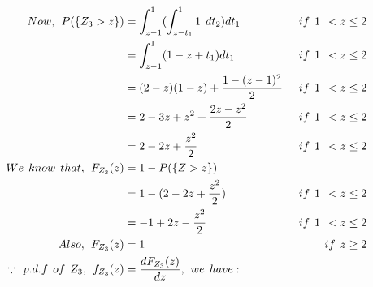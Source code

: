 \documentclass[a4paper,fleqn,11pt]{article}
\theoremstyle{mytheor}
\begin{document}
\begin{align*}
Now, \hspace{1ex} P (\{ Z_3 > z\}) & = \int_{z-1}^{1} (\int_{z - t_{1}}^{1} 1 \hspace{1ex} dt_{2}) dt_{1} \hspace{1ex} & if \hspace{1ex} 1 \hspace{1ex} < z \leq 2 \\
& = \int_{z - 1}^{1} (1 - z + t_{1}) dt_{1} \hspace{1ex} & if \hspace{1ex} 1 \hspace{1ex} < z \leq 2 \\
& = (2 - z)(1 - z) + \frac{1 - (z-1)^2}{2} \hspace{1ex} & if \hspace{1ex} 1 \hspace{1ex} < z \leq 2 \\
& = 2 - 3z + z^2 + \frac{2z - z^2}{2} \hspace{1ex} & if \hspace{1ex} 1 \hspace{1ex} < z \leq 2 \\
& = 2 - 2z + \frac{z^2}{2} \hspace{1ex} & if \hspace{1ex} 1 \hspace{1ex} < z \leq 2 \\
We \hspace{1ex} know \hspace{1ex} that, \hspace{1ex} F_{Z_3}(z) & = 1 - P (\{ Z > z\}) \\
& = 1 - (2 - 2z + \frac{z^2}{2}) \hspace{1ex} & if \hspace{1ex} 1 \hspace{1ex} < z \leq 2 \\
& = -1 + 2z - \frac{z^2}{2} \hspace{1ex} & if \hspace{1ex} 1 \hspace{1ex} < z \leq 2 \\
Also, \hspace{1ex} F_{Z_3}(z) & = 1 \hspace{1ex} & if \hspace{1ex} z \geq 2 \\
\because \hspace{1ex} p.d.f \hspace{1ex} of \hspace{1ex} Z_3, \hspace{1ex} f_{Z_3}(z) & = \frac{dF_{Z_3}(z)}{dz}, \hspace{1ex} we \hspace{1ex} have : \\

\end{align*}
\end{document}
